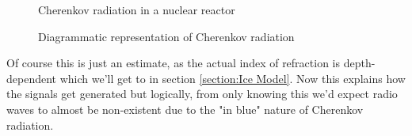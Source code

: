 \documentclass[11pt,a4paper,faculty=we,language=en,doctype=report]{cls/ugent-doc}
\begin{document}
\begin{figure}
\centering
\begin{minipage}{0.45\textwidth}
	\centering
	\caption{Cherenkov radiation in a nuclear reactor}
	\label{figure: Cherenkov reactor}
\end{minipage}
\hspace{0.05\textwidth}
\begin{minipage}{0.45\textwidth}
	\centering
	\caption{Diagrammatic representation of Cherenkov radiation}
	\label{figure: Cherenkov illustratie}
\end{minipage}
\end{figure}
Of course this is just an estimate, as the actual index of refraction is depth-dependent which
we'll get to in section \ref{section:Ice Model}.
Now this explains how the signals get generated but logically, from only knowing this
we'd expect radio waves to almost be non-existent 
due to the "in blue" nature of Cherenkov radiation. 
\end{document}

